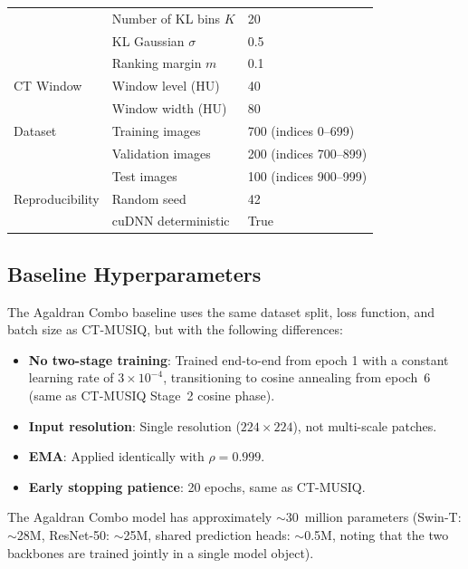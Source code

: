 \begin{table}[h]
\begin{tabular}{lll}
                     & Number of KL bins $K$ & 20 \\
                     & KL Gaussian $\sigma$ & 0.5 \\
                     & Ranking margin $m$ & 0.1 \\
        \midrule
        CT Window    & Window level (HU) & 40 \\
                     & Window width (HU) & 80 \\
        \midrule
        Dataset      & Training images & 700 (indices 0--699) \\
                     & Validation images & 200 (indices 700--899) \\
                     & Test images & 100 (indices 900--999) \\
        \midrule
        Reproducibility & Random seed & 42 \\
                        & cuDNN deterministic & True \\
        \bottomrule
    \end{tabular}
\end{table}

\subsection{Baseline Hyperparameters}

The Agaldran Combo baseline uses the same dataset split, loss function, and batch size
as CT-MUSIQ, but with the following differences:

\begin{itemize}
    \item \textbf{No two-stage training}: Trained end-to-end from epoch 1 with a constant
          learning rate of $3 \times 10^{-4}$, transitioning to cosine annealing from
          epoch~6 (same as CT-MUSIQ Stage~2 cosine phase).
    \item \textbf{Input resolution}: Single resolution ($224 \times 224$), not
          multi-scale patches.
    \item \textbf{EMA}: Applied identically with $\rho = 0.999$.
    \item \textbf{Early stopping patience}: 20 epochs, same as CT-MUSIQ.
\end{itemize}

The Agaldran Combo model has approximately $\sim$30~million parameters (Swin-T:
$\sim$28M, ResNet-50: $\sim$25M, shared prediction heads: $\sim$0.5M, noting that
the two backbones are trained jointly in a single model object).



